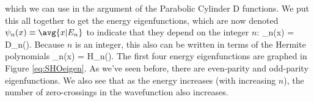 \label{eq:qholengthscale}
\eeq
which we can use in the argument of the Parabolic Cylinder D functions. We put this all together to get the energy eigenfunctions, which are now denoted $\psi_n(x) \equiv \avg{x|E_n}$ to indicate that they depend on the integer $n$:
\beq
\psi_n(x) =   D_n\left(\right).
\eeq
{}%
Because $n$ is an integer, this also can be written in terms of the Hermite polynomials
\beq
\psi_n(x) =  H_n\left(\right).
\eeq
The first four energy eigenfunctions are graphed in Figure \ref{eq:SHOeigen}. As we've seen before, there are even-parity and odd-parity eigenfunctions. We also see that as the energy increases (with increasing $n$), the number of zero-crossings in the wavefunction also increases. 
